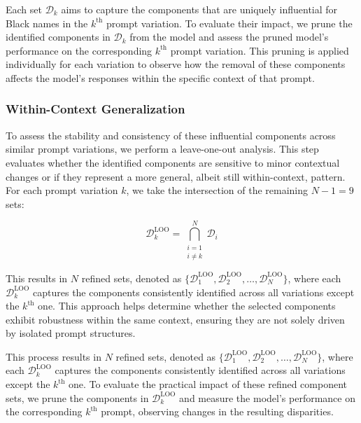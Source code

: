 Each set $\mathcal{D}_k$ aims to capture the components that are uniquely influential for Black names in the $k^\text{th}$ prompt variation. To evaluate their impact, we prune the identified components in $\mathcal{D}_k$ from the model and assess the pruned model's performance on the corresponding $k^\text{th}$ prompt variation. This pruning is applied individually for each variation to observe how the removal of these components affects the model’s responses within the specific context of that prompt.

\subsubsection{Within-Context Generalization}

To assess the stability and consistency of these influential components across similar prompt variations, we perform a leave-one-out analysis. This step evaluates whether the identified components are sensitive to minor contextual changes or if they represent a more general, albeit still within-context, pattern. For each prompt variation $k$, we take the intersection of the remaining $N-1=9$ sets:


\begin{equation}
    \mathcal{D}_k^{\text{LOO}} = \bigcap_{\substack{i=1 \\ i \neq k}}^{N} \mathcal{D}_i
\end{equation}

This results in $N$ refined sets, denoted as $\{\mathcal{D}_1^{\text{LOO}}, \mathcal{D}_2^{\text{LOO}}, \dots, \mathcal{D}_{N}^{\text{LOO}}\}$, where each $\mathcal{D}_k^{\text{LOO}}$ captures the components consistently identified across all variations except the $k^\text{th}$ one. This approach helps determine whether the selected components exhibit robustness within the same context, ensuring they are not solely driven by isolated prompt structures.

This process results in $N$ refined sets, denoted as $\{\mathcal{D}_1^{\text{LOO}}, \mathcal{D}_2^{\text{LOO}}, \dots, \mathcal{D}_{N}^{\text{LOO}}\}$, where each $\mathcal{D}_k^{\text{LOO}}$ captures the components consistently identified across all variations except the $k^\text{th}$ one. To evaluate the practical impact of these refined component sets, we prune the components in $\mathcal{D}_k^{\text{LOO}}$ and measure the model’s performance on the corresponding $k^\text{th}$ prompt, observing changes in the resulting disparities.

